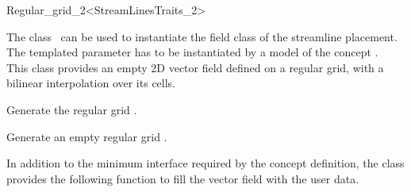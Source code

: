 

\begin{ccRefClass}{Regular_grid_2<StreamLinesTraits_2>}  %

\ccDefinition
  
The class \ccRefName\ can be used to instantiate the field class of
the streamline placement.  The templated parameter  has to be
instantiated by a model of the concept .\\
This class provides an empty 2D vector field defined on a regular
grid, with a bilinear interpolation over its cells.

\ccCreation
{}  %


\ccThreeToTwo
{}
{Generate the regular grid \ccVar.}

\ccThreeToTwo
{}
{Generate an empty regular grid \ccVar.}


In addition to the minimum interface required by the concept
definition, the class \ccRefName provides the following function to
fill the vector field with the user data.




\ccIsModel 

 \\


\ccSeeAlso
{} \\
\end{ccRefClass}


